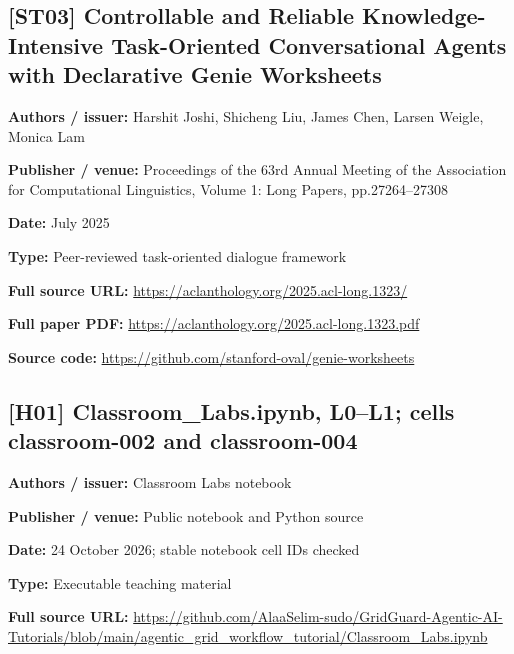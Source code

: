 \documentclass[10pt,letterpaper]{article}
\begin{document}
\subsection*{[ST03] Controllable and Reliable Knowledge-Intensive Task-Oriented Conversational Agents with Declarative Genie Worksheets}
\textbf{Authors / issuer:} Harshit Joshi, Shicheng Liu, James Chen, Larsen Weigle, Monica Lam\par
\textbf{Publisher / venue:} Proceedings of the 63rd Annual Meeting of the Association for Computational Linguistics, Volume 1: Long Papers, pp.27264--27308\par
\textbf{Date:} July 2025\par
\textbf{Type:} Peer-reviewed task-oriented dialogue framework\par
\textbf{Full source URL:} \href{https://aclanthology.org/2025.acl-long.1323/}{\small\ttfamily https:/\allowbreak{}/\allowbreak{}aclanthology.\allowbreak{}org/\allowbreak{}2025.\allowbreak{}acl-\allowbreak{}long.\allowbreak{}1323/\allowbreak{}}\par
\textbf{Full paper PDF:} \href{https://aclanthology.org/2025.acl-long.1323.pdf}{\small\ttfamily https:/\allowbreak{}/\allowbreak{}aclanthology.\allowbreak{}org/\allowbreak{}2025.\allowbreak{}acl-\allowbreak{}long.\allowbreak{}1323.\allowbreak{}pdf}\par
\textbf{Source code:} \href{https://github.com/stanford-oval/genie-worksheets}{\small\ttfamily https:/\allowbreak{}/\allowbreak{}github.\allowbreak{}com/\allowbreak{}stanford-\allowbreak{}oval/\allowbreak{}genie-\allowbreak{}worksheets}\par
\par\medskip
\subsection*{[H01] Classroom\_Labs.ipynb, L0--L1; cells classroom-002 and classroom-004}
\textbf{Authors / issuer:} Classroom Labs notebook\par
\textbf{Publisher / venue:} Public notebook and Python source\par
\textbf{Date:} 24 October 2026; stable notebook cell IDs checked\par
\textbf{Type:} Executable teaching material\par
\textbf{Full source URL:} \href{https://github.com/AlaaSelim-sudo/GridGuard-Agentic-AI-Tutorials/blob/main/agentic_grid_workflow_tutorial/Classroom_Labs.ipynb}{\small\ttfamily https:/\allowbreak{}/\allowbreak{}github.\allowbreak{}com/\allowbreak{}AlaaSelim-\allowbreak{}sudo/\allowbreak{}GridGuard-\allowbreak{}Agentic-\allowbreak{}AI-\allowbreak{}Tutorials/\allowbreak{}blob/\allowbreak{}main/\allowbreak{}agentic\_\allowbreak{}grid\_\allowbreak{}workflow\_\allowbreak{}tutorial/\allowbreak{}Classroom\_\allowbreak{}Labs.\allowbreak{}ipynb}\par
\par\medskip
\end{document}
